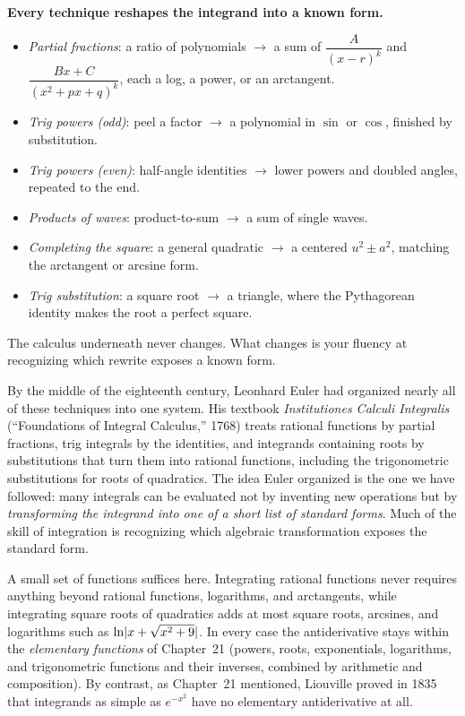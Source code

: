 \begin{focusbox}
\textbf{Every technique reshapes the integrand into a known form.}
\begin{itemize}
\item \emph{Partial fractions}: a ratio of polynomials $\to$ a sum of
   $\dfrac{A}{(x-r)^k}$ and $\dfrac{Bx+C}{(x^2+px+q)^k}$, each a log, a power,
   or an arctangent.
\item \emph{Trig powers (odd)}: peel a factor $\to$ a polynomial in $\sin$ or
   $\cos$, finished by substitution.
\item \emph{Trig powers (even)}: half-angle identities $\to$ lower powers and
   doubled angles, repeated to the end.
\item \emph{Products of waves}: product-to-sum $\to$ a sum of single waves.
\item \emph{Completing the square}: a general quadratic $\to$ a centered
   $u^2 \pm a^2$, matching the arctangent or arcsine form.
\item \emph{Trig substitution}: a square root $\to$ a triangle, where the
   Pythagorean identity makes the root a perfect square.
\end{itemize}
The calculus underneath never changes. What changes is your fluency at
recognizing which rewrite exposes a known form.
\end{focusbox}

\begin{connectionbox}
By the middle of the eighteenth century, Leonhard Euler had organized nearly
all of these techniques into one system. His textbook \emph{Institutiones
Calculi Integralis} (``Foundations of Integral Calculus,'' 1768) treats rational
functions by partial fractions, trig integrals by the identities, and
integrands containing roots by substitutions that turn them into rational
functions, including the trigonometric substitutions for roots of quadratics.
The idea Euler organized is the one we have followed: many integrals can be
evaluated not by inventing new operations but by \emph{transforming the
integrand into one of a short list of standard forms}. Much of the skill of
integration is recognizing which algebraic transformation exposes the standard
form.
\end{connectionbox}

\begin{aestheticbox}
A small set of functions suffices here. Integrating rational functions never
requires anything beyond rational functions, logarithms, and arctangents,
while integrating square roots of quadratics adds at most square roots,
arcsines, and logarithms such as $\ln\lvert x+\sqrt{x^2+9}\rvert$. In every case the
antiderivative stays within the \emph{elementary functions} of Chapter~21
(powers, roots, exponentials, logarithms, and trigonometric functions and their
inverses, combined by arithmetic and composition). By contrast, as Chapter~21
mentioned, Liouville proved in 1835 that integrands as simple as $e^{-x^2}$
have no elementary antiderivative at all.
\end{aestheticbox}

